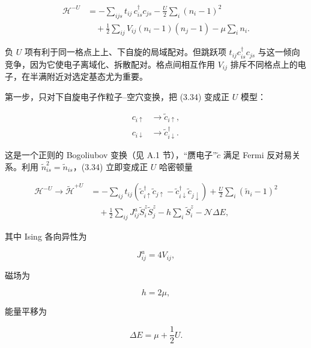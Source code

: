 \begin{align*}
\mathcal {H} ^ {-U} & = - \sum_ {ijs} t _ {ij} \, c _ {is} ^ {\dagger} c _ {js} - \frac {U}{2} \sum_ {i} ( n _ {i} - 1 ) ^ {2}\\
& \quad + \frac {1}{2} \sum_ {ij} V _ {ij} ( n _ {i} - 1 ) ( n _ {j} - 1 ) - \mu \sum_ {i} n _ {i}.
\tag{3.34}
\end{align*}

负 $U$ 项有利于同一格点上上、下自旋的局域配对。但跳跃项 $t_{ij}c_{is}^{\dagger}c_{js}$ 与这一倾向竞争，因为它使电子离域化、拆散配对。格点间相互作用 $V_{ij}$ 排斥不同格点上的电子，在半满附近对选定基态尤为重要。

第一步，只对下自旋电子作粒子--空穴变换，把 (3.34) 变成正 $U$ 模型：

\begin{align*}
c _ {i \uparrow} & \rightarrow \tilde {c} _ {i \uparrow} ,\\
c _ {i \downarrow} & \rightarrow \tilde {c} _ {i \downarrow} ^ {\dagger}.
\tag{3.35}
\end{align*}

这是一个正则的 Bogoliubov 变换（见 A.1 节），“赝电子”$\tilde{c}$ 满足 Fermi 反对易关系。利用 $\tilde{n}_{is}^{2} = \tilde{n}_{is}$，(3.34) 立即变成正 $U$ 哈密顿量

\begin{align*}
\mathcal {H} ^ {-U} \to \tilde {\mathcal {H}} ^ {+U} & = - \sum_ {ij} t _ {ij} \left( \tilde {c} _ {i \uparrow} ^ {\dagger} \tilde {c} _ {j \uparrow} - \tilde {c} _ {i \downarrow} ^ {\dagger} \tilde {c} _ {j \downarrow} \right) + \frac {U}{2} \sum_ {i} ( \tilde {n} _ {i} - 1 ) ^ {2}\\
& \quad + \frac {1}{2} \sum_ {ij} J _ {ij} ^ {a} \tilde {S} _ {i} ^ {z} \tilde {S} _ {j} ^ {z} - h \sum_ {i} \tilde {S} _ {i} ^ {z} - \mathcal {N} \Delta E,
\tag{3.36}
\end{align*}

其中 Ising 各向异性为

\begin{equation*}
J _ {ij} ^ {a} = 4 V _ {ij},
\tag{3.37}
\end{equation*}

磁场为

\begin{equation*}
h = 2 \mu ,
\tag{3.38}
\end{equation*}

能量平移为

\begin{equation*}
\Delta E = \mu + \frac {1}{2} U.
\tag{3.39}
\end{equation*}

